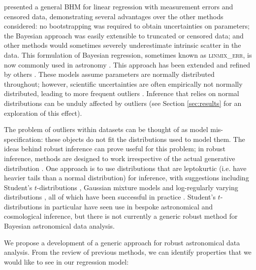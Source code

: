 \documentclass[fleqn,usenatbib]{rasti}
\begin{document}
\citet{Kelly:2007} presented a general BHM for linear regression with
measurement errors and censored data, demonstrating  several advantages over the
other methods considered: no bootstrapping was required to obtain uncertainties
on parameters; the Bayesian approach was easily extensible to truncated or
censored data; and other methods would sometimes severely underestimate
intrinsic scatter in the data. This formulation of Bayesian regression,
sometimes known as \textsc{linmix\_err}, is now commonly used in astronomy
\citep[e.g.][]{McConnell:2013, Bentz:2013, Andrews:2013}. This approach has been
extended and refined by others \citep[e.g.][]{Mantz:2016, Sereno:2016,
Bartlett:2023, Jing:2024}. These
models assume parameters are normally distributed throughout; however,
scientific uncertainties are often empirically not normally distributed, leading
to more frequent outliers \citep{Bailey:2017}. Inference that relies on normal
distributions can be unduly affected by outliers (see Section \ref{sec:results}
for an exploration of this effect).

The problem of outliers within datasets can be thought of as model
mis-specification: these objects do not fit the distributions used to model
them. The ideas behind robust inference can prove useful for this problem; in
robust inference, methods are designed to work irrespective of the actual
generative distribution \citep{Berger:1994}. One approach is to use
distributions that are leptokurtic (i.e. have heavier tails than a normal
distribution) for inference, with suggestions including Student's
$t$-distributions \citep{Andrews:1974}, Gaussian mixture models \citep{Box:1968,
Aitkin:1980} and log-regularly varying distributions
\citep[LRVD;][]{Gagnon:2020, Hamura:2022}, all of which have been successful in
practice \citep[e.g.][]{Berger:1994, Sivia:2006, Gelman:2013, Gagnon:2023,
Hamura:2024}.  Student's $t$-distributions in particular have seen use in
bespoke astronomical \citep[e.g.][]{Andreon:2008, Jontof-Hutter:2016, Park:2017,
Andreon:2020} and cosmological \citep[e.g.][]{Feeney:2018} inference, but there
is not currently a generic robust method for Bayesian astronomical data
analysis.

We propose a development of a generic approach for robust astronomical data
analysis. From the review of previous methods, we can identify properties that
we would like to see in our regression model:
\end{document}
